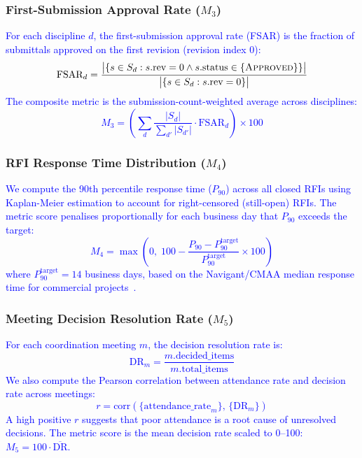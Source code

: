 \documentclass[conference]{IEEEtran}
\newcommand{\placeholder}[1]{\textcolor{blue}{#1}}
\begin{document}
\subsubsection{First-Submission Approval Rate ($M_3$)}
\placeholder{
For each discipline $d$, the first-submission approval rate (FSAR) is the fraction of submittals approved on the first revision (revision index 0):
\begin{equation}
    \text{FSAR}_d = \frac{\bigl|\{s \in S_d : s.\text{rev} = 0 \wedge s.\text{status} \in \{\textsc{Approved}\}\}\bigr|}{\bigl|\{s \in S_d : s.\text{rev} = 0\}\bigr|}
\end{equation}
The composite metric is the submission-count-weighted average across disciplines:
\begin{equation}
    M_3 = \left(\sum_d \frac{|S_d|}{\sum_{d'} |S_{d'}|} \cdot \text{FSAR}_d\right) \times 100
\end{equation}
}

\subsubsection{RFI Response Time Distribution ($M_4$)}
\placeholder{
We compute the 90th percentile response time ($P_{90}$) across all closed RFIs using Kaplan-Meier estimation to account for right-censored (still-open) RFIs. The metric score penalises proportionally for each business day that $P_{90}$ exceeds the target:
\begin{equation}
    M_4 = \max\!\left(0,\; 100 - \frac{P_{90} - P_{90}^{\text{target}}}{P_{90}^{\text{target}}} \times 100\right)
\end{equation}
where $P_{90}^{\text{target}} = 14$ business days, based on the Navigant/CMAA median response time for commercial projects~\cite{navigant2013}.
}

\subsubsection{Meeting Decision Resolution Rate ($M_5$)}
\placeholder{
For each coordination meeting $m$, the decision resolution rate is:
\begin{equation}
    \text{DR}_m = \frac{m.\text{decided\_items}}{m.\text{total\_items}}
\end{equation}
We also compute the Pearson correlation between attendance rate and decision rate across meetings:
\begin{equation}
    r = \text{corr}\!\left(\{\text{attendance\_rate}_m\},\, \{\text{DR}_m\}\right)
\end{equation}
A high positive $r$ suggests that poor attendance is a root cause of unresolved decisions. The metric score is the mean decision rate scaled to 0--100: $M_5 = 100 \cdot \overline{\text{DR}}$.
}
\end{document}
